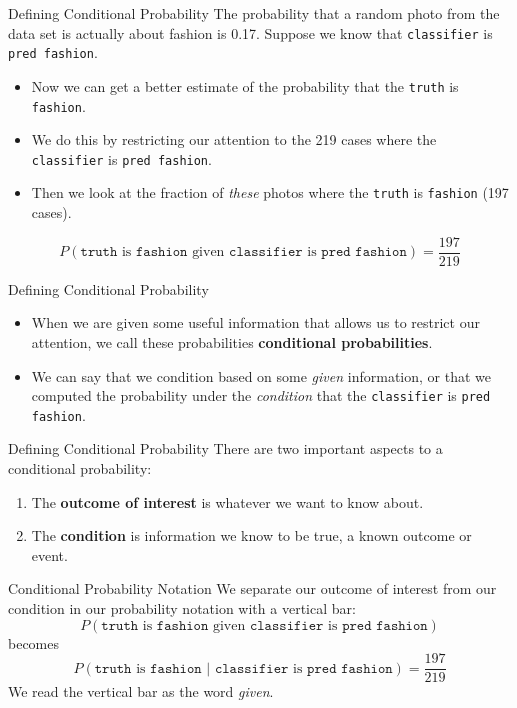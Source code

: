 \begin{frame}{Defining Conditional Probability}
    The probability that a random photo from the data set is actually about fashion is 0.17. Suppose we know that \texttt{classifier} is \texttt{pred fashion}.
    \begin{itemize}
        \item Now we can get a better estimate of the probability that the \texttt{truth} is \texttt{fashion}.
        \item We do this by restricting our attention to the 219 cases where the \texttt{classifier} is \texttt{pred fashion}.
        \item Then we look at the fraction of \textit{these} photos where the \texttt{truth} is \texttt{fashion} (197 cases).
    \end{itemize}
    \[
    P(\texttt{truth} \text{ is } \texttt{fashion} \text{ given } \texttt{classifier} \text{ is } \texttt{pred fashion}) = \frac{197}{219}
    \]
\end{frame}

\begin{frame}{Defining Conditional Probability}
    \begin{itemize}
        \item When we are given some useful information that allows us to restrict our attention, we call these probabilities \textbf{conditional probabilities}. 
        \item We can say that we condition based on some \textit{given} information, or that we computed the probability under the \textit{condition} that the \texttt{classifier} is \texttt{pred fashion}.
    \end{itemize}
\end{frame}

\begin{frame}{Defining Conditional Probability}
    There are two important aspects to a conditional probability:
    \begin{enumerate}
        \item The \textbf{outcome of interest} is whatever we want to know about.
        \item The \textbf{condition} is information we know to be true, a known outcome or event.
    \end{enumerate}
\end{frame}

\begin{frame}{Conditional Probability Notation}
    We separate our outcome of interest from our condition in our probability notation with a vertical bar:
    \[
    P(\texttt{truth} \text{ is } \texttt{fashion} \text{ given } \texttt{classifier} \text{ is } \texttt{pred fashion})
    \]
    becomes
    \[
    P(\texttt{truth} \text{ is } \texttt{fashion } | \texttt{ classifier} \text{ is } \texttt{pred fashion}) = \frac{197}{219}
    \]
    We read the vertical bar as the word \textit{given}.
\end{frame}


